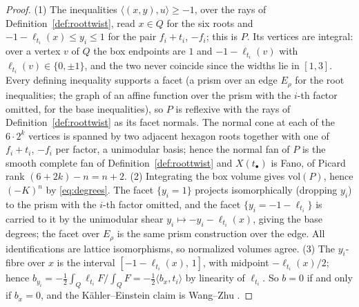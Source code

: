 \documentclass[11pt]{amsart}
\theoremstyle{definition}
\theoremstyle{remark}
\begin{document}
\begin{proof}
(1) The inequalities $\langle (x,y), u\rangle \ge -1$, over the rays of
Definition~\ref{def:roottwist}, read $x \in Q$ for the six roots and
$-1 - \ell_{t_i}(x) \le y_i \le 1$ for the pair $f_i + t_i$, $-f_i$; this
is $P$. Its vertices are integral: over a vertex $v$ of $Q$ the box
endpoints are $1$ and $-1 - \ell_{t_i}(v)$ with
$\ell_{t_i}(v) \in \{0, \pm 1\}$, and the two never coincide since the
widths lie in $[1,3]$. Every defining inequality supports a facet (a
prism over an edge $E_\rho$ for the root inequalities; the graph of an
affine function over the prism with the $i$-th factor omitted, for the
base inequalities), so $P$ is reflexive with the rays of
Definition~\ref{def:roottwist} as its facet normals. The normal cone at
each of the $6 \cdot 2^k$ vertices is spanned by two adjacent hexagon
roots together with one of $f_i + t_i$, $-f_i$ per factor, a unimodular
basis; hence the normal fan of $P$ is the smooth complete fan of
Definition~\ref{def:roottwist} and $X(t_\bullet)$ is Fano, of Picard rank
$(6 + 2k) - n = n + 2$.
(2) Integrating the box volume gives $\mathrm{vol}(P)$, hence $(-K)^n$ by
\eqref{eq:degrees}. The facet $\{y_i = 1\}$ projects
isomorphically (dropping $y_i$) to the prism with the $i$-th factor
omitted, and the facet $\{y_i = -1 - \ell_{t_i}\}$ is carried to it by the
unimodular shear $y_i \mapsto -y_i - \ell_{t_i}(x)$, giving the base
degrees; the facet over $E_\rho$ is the same prism construction over the
edge. All identifications are lattice isomorphisms, so normalized volumes
agree.
(3) The $y_i$-fibre over $x$ is the interval
$[-1 - \ell_{t_i}(x),\, 1]$, with midpoint $-\ell_{t_i}(x)/2$; hence
$b_{y_i} = -\tfrac12 \int_Q \ell_{t_i} F / \int_Q F =
-\tfrac12 \langle b_x, t_i\rangle$ by linearity of $\ell_{t_i}$. So
$b = 0$ if and only if $b_x = 0$, and the K\"ahler--Einstein claim is
Wang--Zhu \cite{Mabuchi1987,WangZhu2004}.
\end{proof}
\end{document}

